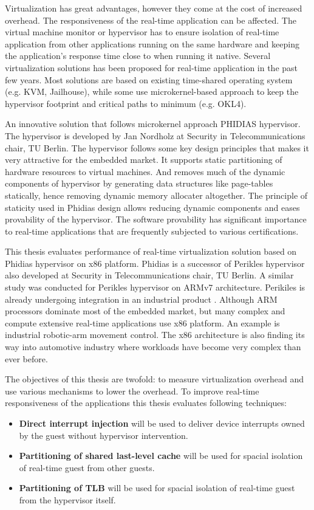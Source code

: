 Virtualization has great advantages, however they come at the cost of increased overhead. 
The responsiveness of the real-time application can be affected. 
The virtual machine monitor or hypervisor has to ensure isolation of real-time application from
other applications running on the same hardware and keeping the application's response time 
close to when running it native. Several virtualization solutions has been proposed for real-time application
in the past few years. Most solutions are based on existing time-shared operating system (e.g. KVM, Jailhouse), while some 
use microkernel-based approach to keep the hypervisor footprint and critical paths to minimum (e.g. OKL4).

An innovative solution that follows microkernel approach PHIDIAS hypervisor. 
The hypervisor is developed by Jan Nordholz at Security in Telecommunications chair, TU Berlin.
The hypervisor follows some key design principles that makes it very attractive for the embedded market.
It supports static partitioning of hardware resources to virtual machines.
And removes much of the dynamic components of hypervisor by generating data structures like page-tables statically, hence removing dynamic memory allocater altogether.
The principle of staticity used in Phidias design allows reducing dynamic components and eases provability of the hypervisor.
The software provability has significant importance to real-time applications that are frequently subjected to various certifications.

This thesis evaluates performance of real-time virtualization solution based on Phidias hypervisor on x86 platform.
Phidias is a successor of Perikles hypervisor also developed at Security in Telecommunications chair, TU Berlin.
A similar study was conducted for Perikles hypervisor on ARMv7 architecture.
Perikiles is already undergoing integration in an industrial product \cite{opensynergy_coqos}.
Although ARM processors dominate most of the embedded market, but many complex and compute extensive real-time applications use x86 platform. 
An example is industrial robotic-arm movement control. 
The x86 architecture is also finding its way into automotive industry where workloads have become very complex than ever before.


The objectives of this thesis are twofold: to measure virtualization overhead and use various mechanisms to lower the overhead.
To improve real-time responsiveness of the applications this thesis evaluates following techniques:
\begin{itemize}
\item \textbf{Direct interrupt injection} will be used to deliver device interrupts owned by the guest without hypervisor intervention.
\item \textbf{Partitioning of shared last-level cache} will be used for spacial isolation of real-time guest from other guests.
\item \textbf{Partitioning of TLB} will be used for spacial isolation of real-time guest from the hypervisor itself.
\end{itemize}


